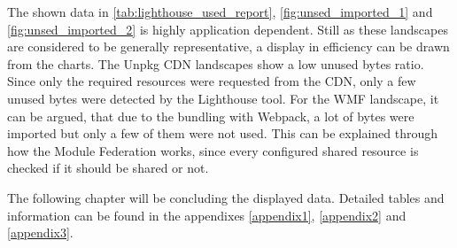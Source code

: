 \normalsize
The shown data in \ref{tab:lighthouse_used_report}, \ref{fig:unsed_imported_1} and \ref{fig:unsed_imported_2} is highly application dependent. Still as these landscapes are considered to be generally representative, a display in efficiency can be drawn from the charts.
The Unpkg CDN landscapes show a low unused bytes ratio. Since only the required resources were requested from the CDN, only a few unused bytes were detected by the Lighthouse tool. 
For the WMF landscape, it can be argued, that due to the bundling with Webpack, a lot of bytes were imported but only a few of them were not used. This can be explained through how the Module Federation works, since every configured shared resource is checked if it should be shared or not.

The following chapter will be concluding the displayed data. Detailed tables and information can be found in the appendixes \ref{appendix1}, \ref{appendix2} and \ref{appendix3}.
